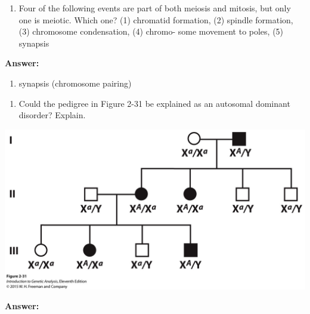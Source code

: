 \documentclass[11pt,]{article}
\providecommand{\tightlist}{%
  \setlength{\itemsep}{0pt}\setlength{\parskip}{0pt}}
\begin{document}
\begin{blackbox}

\begin{enumerate}
\def\labelenumi{\arabic{enumi}.}
\setcounter{enumi}{29}
\tightlist
\item
  Four of the following events are part of both meiosis and mitosis, but
  only one is meiotic. Which one? (1) chromatid formation, (2) spindle
  formation, (3) chromosome condensation, (4) chromo- some movement to
  poles, (5) synapsis
\end{enumerate}

\textbf{Answer:}

\begin{enumerate}
\def\labelenumi{(\arabic{enumi})}
\setcounter{enumi}{4}
\tightlist
\item
  synapsis (chromosome pairing)
\end{enumerate}

\end{blackbox}

\begin{blackbox}

\begin{enumerate}
\def\labelenumi{\arabic{enumi}.}
\setcounter{enumi}{12}
\tightlist
\item
  Could the pedigree in Figure 2-31 be explained as an autosomal
  dominant disorder? Explain.
\end{enumerate}

\begin{center}\includegraphics[width=0.35\linewidth,]{input/figure_02_31} \end{center}

\textbf{Answer:}

\end{blackbox}
\end{document}
